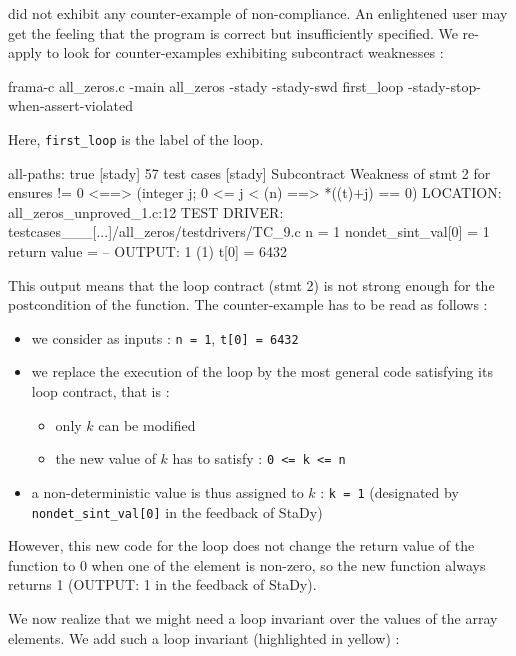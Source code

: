 \documentclass[web]{frama-c-book}
\begin{document}
\stady did not exhibit any counter-example of non-compliance. An enlightened user may get the feeling that the program is correct but insufficiently specified.
We re-apply \stady to look for counter-examples exhibiting subcontract weaknesses :

\begin{shell}
  frama-c all_zeros.c -main all_zeros -stady -stady-swd first_loop
  -stady-stop-when-assert-violated
\end{shell}

Here, \lstinline'first_loop' is the label of the loop.

\begin{shell}
[stady] all-paths: true
[stady] 57 test cases
[stady] Subcontract Weakness of stmt 2 for ensures
                                           \result != 0 <==>
                                           (\forall integer j;
                                              0 <= j < \old(n) ==> *(\old(t)+j) == 0) 
        LOCATION: all_zeros_unproved_1.c:12
        TEST DRIVER: testcases___[...]/all_zeros/testdrivers/TC_9.c
        n = 1
        nondet_sint_val[0] = 1
        return value =  -- OUTPUT: 1 (1)
        t[0] = 6432
\end{shell}

This output means that the loop contract (stmt 2) is not strong enough for the postcondition of the function.
The counter-example has to be read as follows :
\begin{itemize}
\item we consider as inputs : \lstinline'n = 1', \lstinline't[0] = 6432'
\item we replace the execution of the loop by the most general code satisfying its loop contract, that is :
  \begin{itemize}
  \item only $k$ can be modified
  \item the new value of $k$ has to satisfy : \lstinline'0 <= k <= n'
  \end{itemize}
\item a non-deterministic value is thus assigned to $k$ : \lstinline'k = 1' (designated by \lstinline'nondet_sint_val[0]' in the feedback of StaDy)
\end{itemize}
However, this new code for the loop does not change the return value of the function to 0 when one of the element is non-zero, so the new function always returns 1 (OUTPUT: 1 in the feedback of StaDy).

We now realize that we might need a loop invariant over the values of the array elements. We add such a loop invariant (highlighted in yellow) :
\end{document}
